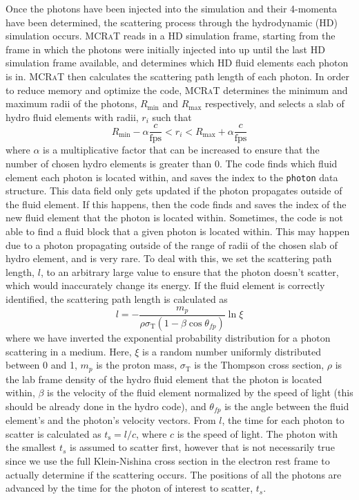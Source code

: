 \documentclass[12pt,a4paper]{article}
\newcommand{\mcrat}{\textsc{MCRaT}}
\begin{document}
Once the photons have been injected into the simulation and their 4-momenta have been determined, the scattering process through the hydrodynamic (HD) simulation occurs. \mcrat{} reads in a HD simulation frame, starting from the frame in which the photons were initially injected into up until the last HD simulation frame available, and determines which HD fluid elements each photon is in. \mcrat{} then calculates the scattering path length of each photon. In order to reduce memory and optimize the code, \mcrat{} determines the minimum and maximum radii of the photons, $R_\mathrm{min}$ and $R_\mathrm{max}$ respectively, and selects a slab of hydro fluid elements with radii, $r_i$ such that 
\[
R_\mathrm{min}-\alpha\frac{c}{\mathrm{fps}} < r_i < R_\mathrm{max}+\alpha\frac{c}{\mathrm{fps}} 
\] 
where $\alpha$ is a multiplicative factor that can be increased to ensure that the number of chosen hydro elements is greater than 0. The code finds which fluid element each photon is located within, and saves the index to the \texttt{photon} data structure. This data field only gets updated if the photon propagates outside of the fluid element. If this happens, then the code finds and saves the index of the new fluid element that the photon is located within. Sometimes, the code is not able to find a fluid block that a given photon is located within. This may happen due to a photon propagating outside of the range of radii of the chosen slab of hydro element, and is very rare. To deal with this, we set the scattering path length, $l$, to an arbitrary large value to ensure that the photon doesn't scatter, which would inaccurately change its energy. If the fluid element is correctly identified, the scattering path length is calculated as  
\[
l=-\frac{m_p}{\rho\sigma_\mathrm{T}(1-\beta\cos\theta_{fp})}\ln\xi
\]
where we have inverted the exponential probability distribution for a photon scattering in a medium. Here, $\xi$ is a random number uniformly distributed between 0 and 1, $m_p$ is the proton mass, $\sigma_\mathrm{T}$ is the Thompson cross section, $\rho$ is the lab frame density of the hydro fluid element that the photon is located within, $\beta$ is the velocity of the fluid element normalized by the speed of light (this should be already done in the hydro code), and $\theta_{fp}$ is the angle between the fluid element's and the photon's velocity vectors. From $l$, the time for each photon to scatter is calculated as $t_\mathrm{s}=l/c$, where $c$ is the speed of light. The photon with the smallest $t_s$ is assumed to scatter first, however that is not necessarily true since we use the full Klein-Nishina cross section in the electron rest frame to actually determine if the scattering occurs. The positions of all the photons are advanced by the time for the photon of interest to scatter, $t_s$.
\end{document}
